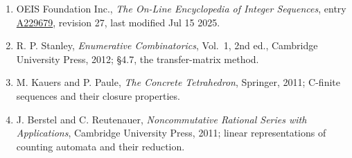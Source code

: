\documentclass[11pt]{article}
\theoremstyle{definition}
\begin{document}
\begin{enumerate}

\item OEIS Foundation Inc., \emph{The On-Line Encyclopedia of Integer Sequences}, entry \href{https://oeis.org/A229679}{A229679}, revision 27, last modified Jul 15 2025.

\item R. P. Stanley, \emph{Enumerative Combinatorics}, Vol.~1, 2nd ed., Cambridge University Press, 2012; \S4.7, the transfer-matrix method.

\item M. Kauers and P. Paule, \emph{The Concrete Tetrahedron}, Springer, 2011; C-finite sequences and their closure properties.

\item J. Berstel and C. Reutenauer, \emph{Noncommutative Rational Series with Applications}, Cambridge University Press, 2011; linear representations of counting automata and their reduction.

\end{enumerate}
\end{document}
